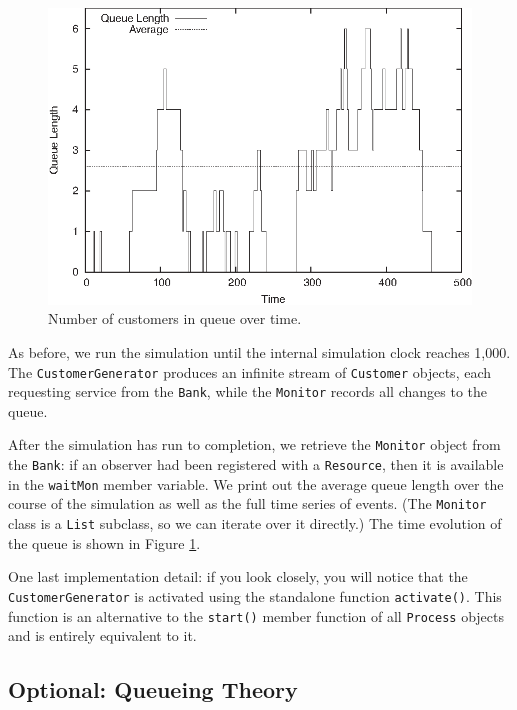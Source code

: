 \begin{figure}
  \centerline{\includegraphics{img/simpy2}}
  \caption{Number of customers in queue over time.}\label{fig:simpy2}\vspace*{-6pt}
\end{figure}

As before, we run the simulation until the internal simulation clock
reaches 1,000.  The \texttt{CustomerGenerator} produces an infinite
stream of \texttt{Customer} objects, each requesting service from the
\texttt{Bank}, while the \texttt{Monitor} records all changes to the
queue.

After the simulation has run to completion, we retrieve the
\texttt{Monitor} object from the \texttt{Bank}: if an observer had
been registered with a \texttt{Resource}, then it is available in the
\texttt{waitMon} member variable.  We print out the average queue
length over the course of the simulation as well as the full time
series of events. (The \texttt{Monitor} class is a \texttt{List}
subclass, so we can iterate over it directly.) The time evolution of
the queue is shown in Figure \ref{fig:simpy2}.

One last implementation detail: if you look closely, you will notice
that the \texttt{CustomerGenerator} is activated using the standalone
function \texttt{activate()}.  This function is an alternative to the
\texttt{start()} member function of all \texttt{Process} objects and
is entirely equivalent to it.

\vspace*{-6pt}
\subsection{Optional: Queueing Theory}

